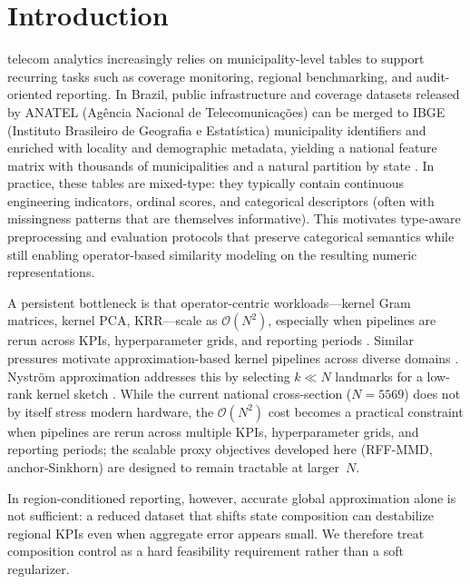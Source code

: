 \documentclass[10pt,journal]{IEEEtran}
\newcommand{\datasetN}{5569}              %
\newcommand{\1}{\mathbf{1}}
\theoremstyle{ieeethm}
\begin{document}
\section{Introduction}
\label{sec:intro}

 telecom analytics increasingly relies on municipality-level tables to support recurring
tasks such as coverage monitoring, regional benchmarking, and audit-oriented reporting.
In Brazil, public infrastructure and coverage datasets released by ANATEL (Ag\^{e}ncia Nacional de Telecomunica\c{c}\~{o}es) can be merged to IBGE (Instituto Brasileiro de Geografia e Estat\'{i}stica) municipality
identifiers and enriched with locality and demographic metadata, yielding a national feature matrix with thousands
of municipalities and a natural partition by state \cite{anatelEstacoesLicenciadasSMP,anatelCoberturaMovel,ibgeLocalidades,ibgePopEst2025}.
In practice, these tables are mixed-type: they typically contain continuous engineering indicators, ordinal scores,
and categorical descriptors (often with missingness patterns that are themselves informative). This motivates
type-aware preprocessing and evaluation protocols that preserve categorical semantics while still enabling
operator-based similarity modeling on the resulting numeric representations.

A persistent bottleneck is that operator-centric workloads---kernel Gram matrices, kernel PCA,
KRR---scale as $\mathcal{O}(N^2)$, especially when pipelines are rerun across KPIs, hyperparameter
grids, and reporting periods \cite{scholkopf2002learning,liu2010kaf,engel2004krls}. Similar pressures
motivate approximation-based kernel pipelines across diverse domains
\cite{pinar_rice_hi_anderson_havens_2017,atlante_trinchero_stievano_mihai_2025,ren_ren_ma_li_dai_2025,afaq_muhammad_2025}.
Nyström approximation addresses this by selecting $k\!\ll\!N$ landmarks for a low-rank kernel
sketch \cite{williams2001nystrom,gittens2016nystrom}. While the current national cross-section
($N=\datasetN$) does not by itself stress modern hardware, the $\mathcal{O}(N^2)$ cost becomes
a practical constraint when pipelines are rerun across multiple KPIs, hyperparameter grids, and
reporting periods; the scalable proxy objectives developed here (RFF-MMD, anchor-Sinkhorn)
are designed to remain tractable at larger~$N$.

In region-conditioned reporting, however, accurate global approximation alone is not sufficient:
a reduced dataset that shifts state composition can destabilize regional KPIs even when aggregate
error appears small. We therefore treat composition control as a hard feasibility requirement
rather than a soft regularizer.
\end{document}
